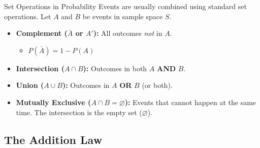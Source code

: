 \begin{frame}{Set Operations in Probability}
    Events are usually combined using standard set operations. Let $A$ and $B$ be events in sample space $S$.

    \begin{itemize}
        \item \textbf{Complement ($\bar{A}$ or $A'$):} All outcomes \textit{not} in $A$. 
        \begin{itemize}
            \item $P(\bar{A}) = 1 - P(A)$
        \end{itemize}
        \item \textbf{Intersection ($A \cap B$):} Outcomes in both $A$ \textbf{AND} $B$.
        \item \textbf{Union ($A \cup B$):} Outcomes in $A$ \textbf{OR} $B$ (or both).
        \item \textbf{Mutually Exclusive ($A \cap B = \varnothing$):} Events that cannot happen at the same time. The intersection is the empty set ($\varnothing$).
    \end{itemize}

\end{frame}

\subsection{The Addition Law}

